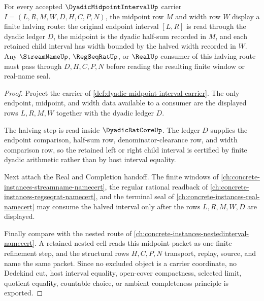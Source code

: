 \begin{theorem}
\label{thm:dyadic-midpoint-interval-halving}
For every accepted $\DyadicMidpointIntervalUp$ carrier $I=(L,R,M,W,D,H,C,P,N)$, the midpoint row $M$ and width row $W$ display a finite halving route: the original endpoint interval $[L,R]$ is read through the dyadic ledger $D$, the midpoint is the dyadic half-sum recorded in $M$, and each retained child interval has width bounded by the halved width recorded in $W$. Any $\StreamNameUp$, $\RegSeqRatUp$, or $\RealUp$ consumer of this halving route must pass through $D,H,C,P,N$ before reading the resulting finite window or real-name seal.
\end{theorem}
\begin{proof}
Project the carrier of \autoref{def:dyadic-midpoint-interval-carrier}. The only endpoint, midpoint, and width data available to a consumer are the displayed rows $L,R,M,W$ together with the dyadic ledger $D$.

The halving step is read inside $\DyadicRatCoreUp$. The ledger $D$ supplies the endpoint comparison, half-sum row, denominator-clearance row, and width comparison row, so the retained left or right child interval is certified by finite dyadic arithmetic rather than by host interval equality.

Next attach the Real and Completion handoff. The finite windows of \autoref{ch:concrete-instances-streamname-namecert}, the regular rational readback of \autoref{ch:concrete-instances-regseqrat-namecert}, and the terminal seal of \autoref{ch:concrete-instances-real-namecert} may consume the halved interval only after the rows $L,R,M,W,D$ are displayed.

Finally compare with the nested route of \autoref{ch:concrete-instances-nestedinterval-namecert}. A retained nested cell reads this midpoint packet as one finite refinement step, and the structural rows $H,C,P,N$ transport, replay, source, and name the same packet. Since no excluded object is a carrier coordinate, no Dedekind cut, host interval equality, open-cover compactness, selected limit, quotient equality, countable choice, or ambient completeness principle is exported.
\end{proof}

